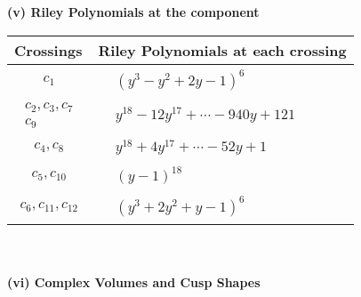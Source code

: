 \documentclass[1p]{elsarticle_modified}
\theoremstyle{definition}
\begin{document}
\newpage\renewcommand{\arraystretch}{1}
\flushleft \textbf{(v) Riley Polynomials at the component}\newline \\
\begin{tabular}{m{50pt}|m{274pt}}
Crossings & \hspace{64pt}Riley Polynomials at each crossing \\
\hline $$\begin{aligned}c_{1}\end{aligned}$$&$\begin{aligned}
&(y^3- y^2+2 y-1)^6
\end{aligned}$\\
\hline $$\begin{aligned}c_{2},c_{3},c_{7}\\c_{9}\end{aligned}$$&$\begin{aligned}
&y^{18}-12 y^{17}+\cdots-940 y+121
\end{aligned}$\\
\hline $$\begin{aligned}c_{4},c_{8}\end{aligned}$$&$\begin{aligned}
&y^{18}+4 y^{17}+\cdots-52 y+1
\end{aligned}$\\
\hline $$\begin{aligned}c_{5},c_{10}\end{aligned}$$&$\begin{aligned}
&(y-1)^{18}
\end{aligned}$\\
\hline $$\begin{aligned}c_{6},c_{11},c_{12}\end{aligned}$$&$\begin{aligned}
&(y^3+2 y^2+y-1)^6
\end{aligned}$\\
\hline
\end{tabular}\\~\\
\newpage\flushleft \textbf{(vi) Complex Volumes and Cusp Shapes}
\end{document}
